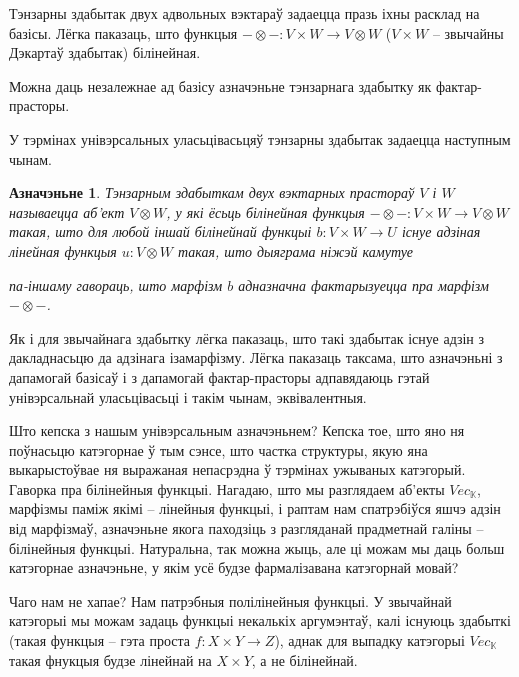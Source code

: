 \documentclass[a4paper,12pt]{book}
\newtheorem{definition}{Азначэньне}[section]
\begin{document}
Тэнзарны здабытак двух адвольных вэктараў задаецца празь іхны расклад
на базісы. Лёгка паказаць, што функцыя $- \otimes -: V \times W
\rightarrow V \otimes W$ ($V \times W$ -- звычайны Дэкартаў здабытак)
білінейная.

Можна даць незалежнае ад базісу азначэньне тэнзарнага здабытку як
фактар-прасторы.

У тэрмінах унівэрсальных уласьцівасьцяў тэнзарны здабытак задаецца
наступным чынам.

\begin{definition}
  Тэнзарным здабыткам двух вэктарных прастораў $V$ і $W$ называецца
  аб'ект $V \otimes W$, у які ёсьць білінейная функцыя $- \otimes -: V \times W
  \rightarrow V \otimes W$ такая, што для любой іншай білінейнай
  функцыі $b: V \times W \rightarrow U$ існуе адзіная лінейная
  функцыя $u: V \otimes W$ такая, што дыяграма ніжэй камутуе


  па-іншаму гавораць, што марфізм $b$ адназначна фактарызуецца пра
  марфізм $- \otimes -$.
\end{definition}

Як і для звычайнага здабытку лёгка паказаць, што такі здабытак існуе
адзін з дакладнасьцю да адзінага ізамарфізму. Лёгка паказаць таксама,
што азначэньні з дапамогай базісаў і з дапамогай фактар-прасторы
адпавядаюць гэтай унівэрсальнай уласьцівасьці і такім чынам,
эквівалентныя.

Што кепска з нашым унівэрсальным азначэньнем? Кепска тое, што яно ня
поўнасьцю катэгорнае ў тым сэнсе, што частка структуры, якую яна
выкарыстоўвае ня выражаная непасрэдна ў тэрмінах ужываных
катэгорый. Гаворка пра білінейныя функцыі. Нагадаю, што мы разглядаем
аб'екты $Vec_{\mathbb{K}}$, марфізмы паміж якімі -- лінейныя функцыі,
і раптам нам спатрэбіўся яшчэ адзін від марфізмаў, азначэньне якога
паходзіць з разгляданай прадметнай галіны -- білінейныя
функцыі. Натуральна, так можна жыць, але ці можам мы даць больш
катэгорнае азначэньне, у якім усё будзе фармалізавана катэгорнай
мовай?

Чаго нам не хапае? Нам патрэбныя полілінейныя функцыі. У звычайнай
катэгорыі мы можам задаць функцыі некалькіх аргумэнтаў, калі існуюць
здабыткі (такая функцыя -- гэта проста $f: X \times Y \rightarrow Z$),
аднак для выпадку катэгорыі $Vec_{\mathbb{K}}$ такая фнукцыя будзе
лінейнай на $X \times Y$, а не білінейнай.
\end{document}
